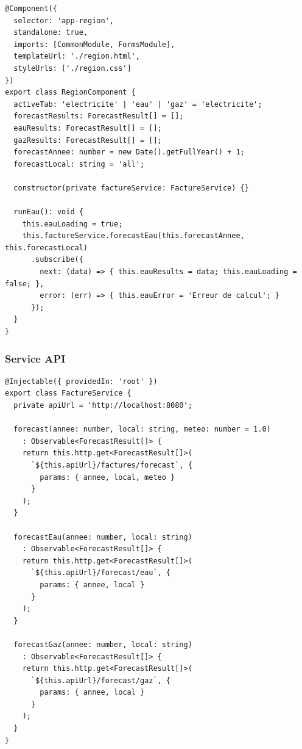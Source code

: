 \documentclass[12pt,a4paper]{article}
\begin{document}
\begin{lstlisting}[style=typescript, caption=Composant Region avec 3 onglets]
@Component({
  selector: 'app-region',
  standalone: true,
  imports: [CommonModule, FormsModule],
  templateUrl: './region.html',
  styleUrls: ['./region.css']
})
export class RegionComponent {
  activeTab: 'electricite' | 'eau' | 'gaz' = 'electricite';
  forecastResults: ForecastResult[] = [];
  eauResults: ForecastResult[] = [];
  gazResults: ForecastResult[] = [];
  forecastAnnee: number = new Date().getFullYear() + 1;
  forecastLocal: string = 'all';

  constructor(private factureService: FactureService) {}

  runEau(): void {
    this.eauLoading = true;
    this.factureService.forecastEau(this.forecastAnnee, this.forecastLocal)
      .subscribe({
        next: (data) => { this.eauResults = data; this.eauLoading = false; },
        error: (err) => { this.eauError = 'Erreur de calcul'; }
      });
  }
}
\end{lstlisting}

\subsubsection{Service API}
\begin{lstlisting}[style=typescript, caption=Service d'appel API pour l'estimation]
@Injectable({ providedIn: 'root' })
export class FactureService {
  private apiUrl = 'http://localhost:8080';

  forecast(annee: number, local: string, meteo: number = 1.0)
    : Observable<ForecastResult[]> {
    return this.http.get<ForecastResult[]>(
      `${this.apiUrl}/factures/forecast`, {
        params: { annee, local, meteo }
      }
    );
  }

  forecastEau(annee: number, local: string)
    : Observable<ForecastResult[]> {
    return this.http.get<ForecastResult[]>(
      `${this.apiUrl}/forecast/eau`, {
        params: { annee, local }
      }
    );
  }

  forecastGaz(annee: number, local: string)
    : Observable<ForecastResult[]> {
    return this.http.get<ForecastResult[]>(
      `${this.apiUrl}/forecast/gaz`, {
        params: { annee, local }
      }
    );
  }
}
\end{lstlisting}
\end{document}
